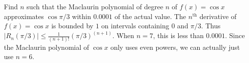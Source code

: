 {Find $n$ such that the  Maclaurin polynomial of degree $n$ of $f(x)= \cos x$ approximates $\cos \pi/3$ within $0.0001$ of the actual value.
}
{The $n^\text{th}$ derivative of $f(x)=\cos x$ is bounded by $1$ on intervals containing $0$ and $\pi/3$. Thus $|R_n(\pi/3)|\leq \frac{1}{(n+1)!}(\pi/3)^{(n+1)}$. When $n=7$, this is less than $0.0001$. Since the Maclaurin polynomial of $\cos x$ only uses even powers, we can actually just use $n=6$.
}